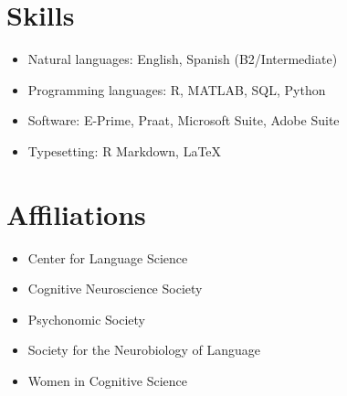 \documentclass[11pt,a4paper,]{awesome-cv}
\providecommand{\tightlist}{%
	\setlength{\itemsep}{0pt}\setlength{\parskip}{0pt}}
\begin{document}
\hypertarget{skills}{%
\section{Skills}\label{skills}}

\begin{itemize}
\tightlist
\item
  Natural languages: English, Spanish (B2/Intermediate)
\item
  Programming languages: R, MATLAB, SQL, Python
\item
  Software: E-Prime, Praat, Microsoft Suite, Adobe Suite
\item
  Typesetting: R Markdown, \LaTeX
\end{itemize}

\hypertarget{affiliations}{%
\section{Affiliations}\label{affiliations}}

\begin{itemize}
\tightlist
\item
  Center for Language Science
\item
  Cognitive Neuroscience Society
\item
  Psychonomic Society
\item
  Society for the Neurobiology of Language
\item
  Women in Cognitive Science
\end{itemize}
\end{document}
